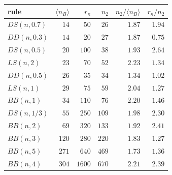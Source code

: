 \begin{center}
\small
\begin{tabular}{lrrrrr}
\hline
rule & $\langle n_B\rangle$ & $r_\kappa$ & $n_2$ & $n_2/\langle n_B\rangle$ & $r_\kappa/n_2$\\
\hline
$DS(n,0.7)$ & $14$ & $50$ & $26$ & $1.87$ & $1.94$\\
$DD(n,0.3)$ & $14$ & $20$ & $27$ & $1.87$ & $0.75$\\
$DS(n,0.5)$ & $20$ & $100$ & $38$ & $1.93$ & $2.64$\\
$LS(n,2)$ & $23$ & $70$ & $52$ & $2.23$ & $1.34$\\
$DD(n,0.5)$ & $26$ & $35$ & $34$ & $1.34$ & $1.02$\\
$LS(n,1)$ & $29$ & $75$ & $59$ & $2.04$ & $1.27$\\
$BB(n,1)$ & $34$ & $110$ & $76$ & $2.20$ & $1.46$\\
$DS(n,1/3)$ & $55$ & $250$ & $109$ & $1.98$ & $2.30$\\
$BB(n,2)$ & $69$ & $320$ & $133$ & $1.92$ & $2.41$\\
$BB(n,3)$ & $120$ & $280$ & $220$ & $1.83$ & $1.27$\\
$BB(n,5)$ & $271$ & $640$ & $469$ & $1.73$ & $1.36$\\
$BB(n,4)$ & $304$ & $1600$ & $670$ & $2.21$ & $2.39$\\
\hline
\end{tabular}
\end{center}
